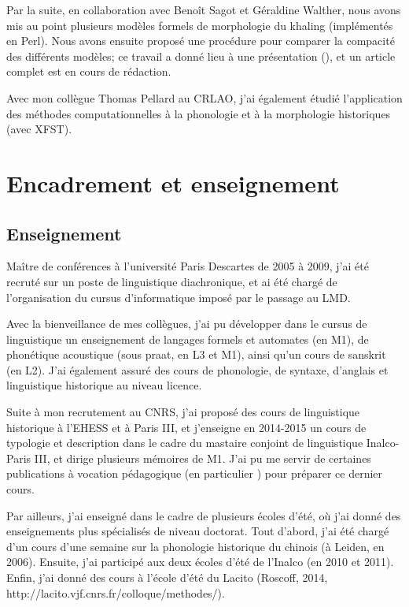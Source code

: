 \documentclass[oldfontcommands,oneside,a4paper,11pt]{article}
\begin{document}
Par la suite, en collaboration avec Benoît Sagot et Géraldine Walther, nous avons mis au point plusieurs modèles formels de morphologie du khaling (implémentés en Perl). Nous avons ensuite proposé une procédure pour comparer la compacité des différents modèles; ce travail a donné lieu à une présentation (\citealt{walther14compactness}), et un article complet est en cours de rédaction.
 
 Avec mon collègue Thomas Pellard au CRLAO, j'ai également étudié l'application des méthodes computationnelles à la phonologie et à la morphologie historiques (avec XFST). 

\section{Encadrement et enseignement}

\subsection{Enseignement} \label{sec:enseignement}
Maître de conférences à l'université Paris Descartes de 2005 à 2009, j'ai été recruté sur un poste de linguistique diachronique, et ai été chargé de l'organisation du cursus d'informatique imposé par le passage au LMD.

Avec la bienveillance de mes collègues, j'ai pu développer dans le cursus de linguistique un enseignement de langages formels et automates (en M1), de phonétique acoustique (sous praat, en L3 et M1), ainsi qu'un cours de sanskrit (en L2). J'ai également assuré des cours de phonologie, de syntaxe, d'anglais et linguistique historique au niveau licence.

Suite à mon recrutement au CNRS, j'ai proposé des cours de linguistique historique à l'EHESS et à Paris III, et j'enseigne en 2014-2015 un cours de typologie et description dans le cadre du mastaire conjoint de linguistique Inalco-Paris III, et dirige plusieurs mémoires de M1. J'ai pu me servir de certaines publications à vocation pédagogique (en particulier \citealt{jacques14inverse}) pour préparer ce dernier cours.

Par ailleurs, j'ai enseigné dans le cadre de plusieurs écoles d'été, où j'ai donné des enseignements plus spécialisés de niveau doctorat. Tout d'abord, j'ai été chargé d'un cours d'une semaine sur la phonologie historique du chinois (à Leiden, en 2006). Ensuite, j'ai participé aux deux écoles d'été de l'Inalco (en 2010 et 2011). Enfin, j'ai donné des cours à l'école d'été du Lacito (Roscoff, 2014, http://lacito.vjf.cnrs.fr/colloque/methodes/).
 
\end{document}
